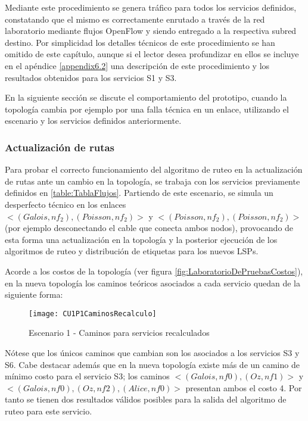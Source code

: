 Mediante este procedimiento se genera tr\'afico para todos los servicios definidos, constatando que el mismo es correctamente enrutado a trav\'es de la red laboratorio mediante flujos OpenFlow y siendo entregado a la respectiva subred destino. Por simplicidad los detalles t\'ecnicos de este procedimiento se han omitido de este cap\'itulo, aunque si el lector desea profundizar en ellos se incluye en el ap\'endice \ref{appendix6.2} una descripci\'on de este procedimiento y los resultados obtenidos para los servicios S1 y S3.

En la siguiente secci\'on se discute el comportamiento del prototipo, cuando la topolog\'ia cambia por ejemplo por una falla t\'ecnica en un enlace, utilizando el escenario y los servicios definidos anteriormente.

\subsubsection{Actualizaci\'on de rutas}
Para probar el correcto funcionamiento del algoritmo de ruteo en la actualizaci\'on de rutas ante un cambio en la topolog\'ia, se trabaja con los servicios previamente definidos en \ref{table:TablaFlujos}. Partiendo de este escenario, se simula un desperfecto t\'ecnico en los enlaces \\ $<(Galois, nf_2), (Poisson, nf_2)>$ y  $<(Poisson, nf_2), (Poisson, nf_2)>$ (por ejemplo desconectando el cable que conecta ambos nodos), provocando de esta forma una actualizaci\'on en la topolog\'ia y la posterior ejecuci\'on de los algoritmos de ruteo y distribución de etiquetas para los nuevos LSPs.
 
Acorde a los costos de la topolog\'ia (ver figura \ref{fig:LaboratorioDePruebasCostos}), en la nueva topolog\'ia los caminos te\'oricos asociados a cada servicio quedan de la siguiente forma:

\begin{figure}[h] 
\centering    
\texttt{[image: CU1P1CaminosRecalculo]}
\caption[Escenario 1 - Caminos para servicios recalculados]{Escenario 1 - Caminos para servicios recalculados}
\label{fig:CUP1Caminos2}
\end{figure}
 
N\'otese que los \'unicos caminos que cambian son los asociados a los servicios S3 y S6. Cabe destacar adem\'as que en la nueva topolog\'ia existe m\'as de un camino de m\'inimo costo para el servicio S3; los caminos $<(Galois, nf0), (Oz, nf1)>$ y \\ $<(Galois, nf0), (Oz, nf2), (Alice, nf0)>$ presentan ambos el costo 4. Por tanto se tienen dos resultados v\'alidos posibles para la salida del algoritmo de ruteo para este servicio.

